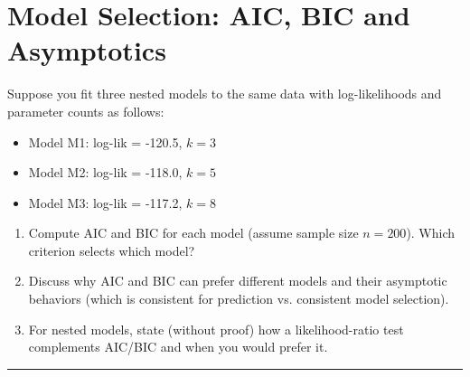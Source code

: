 \documentclass[12pt,a4paper]{article}
\begin{document}
\section{Model Selection: AIC, BIC and Asymptotics}
Suppose you fit three nested models to the same data with log-likelihoods and parameter counts as follows:
\begin{itemize}
    \item Model M1: log-lik = -120.5, \(k=3\)
    \item Model M2: log-lik = -118.0, \(k=5\)
    \item Model M3: log-lik = -117.2, \(k=8\)
\end{itemize}
\begin{enumerate}[label=(\arabic*)]
\item Compute AIC and BIC for each model (assume sample size \(n=200\)). Which criterion selects which model?
\item Discuss why AIC and BIC can prefer different models and their asymptotic behaviors (which is consistent for prediction vs. consistent model selection).
\item For nested models, state (without proof) how a likelihood-ratio test complements AIC/BIC and when you would prefer it.
\end{enumerate}

\bigskip
\hrule
\bigskip

\end{document}
